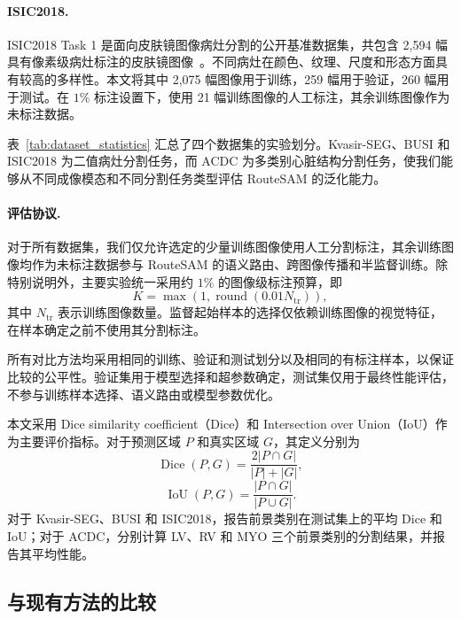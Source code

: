 \documentclass[UTF8,a4paper,10pt,twocolumn]{ctexart}
\begin{document}
\paragraph{ISIC2018.}
ISIC2018 Task 1 是面向皮肤镜图像病灶分割的公开基准数据集，共包含 2,594 幅具有像素级病灶标注的皮肤镜图像~\cite{codella2019isic2018}。不同病灶在颜色、纹理、尺度和形态方面具有较高的多样性。本文将其中 2,075 幅图像用于训练，259 幅用于验证，260 幅用于测试。在 $1\%$ 标注设置下，使用 21 幅训练图像的人工标注，其余训练图像作为未标注数据。

表~\ref{tab:dataset_statistics} 汇总了四个数据集的实验划分。Kvasir-SEG、BUSI 和 ISIC2018 为二值病灶分割任务，而 ACDC 为多类别心脏结构分割任务，使我们能够从不同成像模态和不同分割任务类型评估 RouteSAM 的泛化能力。



\paragraph{评估协议.}
对于所有数据集，我们仅允许选定的少量训练图像使用人工分割标注，其余训练图像均作为未标注数据参与 RouteSAM 的语义路由、跨图像传播和半监督训练。除特别说明外，主要实验统一采用约 $1\%$ 的图像级标注预算，即
\begin{equation}
K=\max\left(1,\operatorname{round}(0.01N_{\mathrm{tr}})\right),
\end{equation}
其中 $N_{\mathrm{tr}}$ 表示训练图像数量。监督起始样本的选择仅依赖训练图像的视觉特征，在样本确定之前不使用其分割标注。

所有对比方法均采用相同的训练、验证和测试划分以及相同的有标注样本，以保证比较的公平性。验证集用于模型选择和超参数确定，测试集仅用于最终性能评估，不参与训练样本选择、语义路由或模型参数优化。

本文采用 Dice similarity coefficient（Dice）和 Intersection over Union（IoU）作为主要评价指标。对于预测区域 $P$ 和真实区域 $G$，其定义分别为
\begin{equation}
\operatorname{Dice}(P,G)
=
\frac{2|P\cap G|}{|P|+|G|},
\end{equation}
\begin{equation}
\operatorname{IoU}(P,G)
=
\frac{|P\cap G|}{|P\cup G|}.
\end{equation}
对于 Kvasir-SEG、BUSI 和 ISIC2018，报告前景类别在测试集上的平均 Dice 和 IoU；对于 ACDC，分别计算 LV、RV 和 MYO 三个前景类别的分割结果，并报告其平均性能。



\subsection{与现有方法的比较}
\label{sec:comparison}
\end{document}
